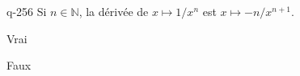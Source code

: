 \begin{truefalse}{q-256}
Si $n \in \mathbb N$, la dérivée de $x\mapsto 1/x^n$ est $x\mapsto -n/x^{n+1}$.
\item Vrai
\item* Faux
\end{truefalse}

